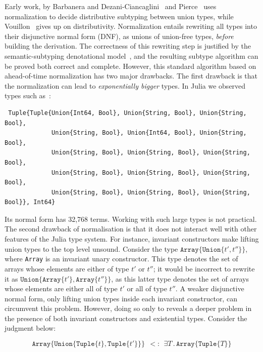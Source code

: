 \documentclass[a4paper,english]{lipics-v2019}
\newcommand{\xt}[1]{\texttt{#1}}
\newcommand{\union}[2]{\xt{Union\{}#1,#2\xt{\}}}
\newcommand{\tuple}[1]{\xt{Tuple\{}#1\xt{\}}}
\newcommand{\arrayt}[1]{\xt{Array\{}#1\xt{\}}}
\begin{document}
Early work, by Barbanera and
Dezani-Ciancaglini~\cite{barbanera1991intersection} and
Pierce~\cite{Pierce1991} uses normalization to decide distributive subtyping
between union types, while Vouillon~\cite{Vouillon04} gives up on
distributivity. Normalization entails rewriting all types into their
disjunctive normal form (DNF), as unions of union-free types, \emph{before}
building the derivation. The correctness of this rewriting step is justified
by the semantic-subtyping denotational model~\cite{Frisch08}, and the
resulting subtype algorithm can be proved both correct and complete.
However, this standard algorithm based on ahead-of-time normalization has
two major drawbacks.  The first drawback is that the normalization can lead
to \emph{exponentially bigger} types. In Julia we observed
types such as~\cite{DBLP:NardelliBPCBV18}:

\begin{small}
\begin{verbatim}
 Tuple{Tuple{Union{Int64, Bool}, Union{String, Bool}, Union{String, Bool}, 
             Union{String, Bool}, Union{Int64, Bool}, Union{String, Bool}, 
             Union{String, Bool}, Union{String, Bool}, Union{String, Bool}, 
             Union{String, Bool}, Union{String, Bool}, Union{String, Bool}, 
             Union{String, Bool}, Union{String, Bool}, Union{String, Bool}}, Int64}
\end{verbatim}
\end{small}

\noindent Its normal form has 32,768 terms. Working with such large types is
not practical.  The second drawback of normalisation is that it does not
interact well with other features of the Julia type system. For instance,
invariant constructors make lifting union types to the top level unsound.
Consider the type {\small \(\arrayt{\union{t'}{t''}}\)}, where {\small
  \texttt{Array}} is an invariant unary constructor.  This type denotes the
set of arrays whose elements are either of type {\small $t'$} or {\small
  $t''$}; it would be incorrect to rewrite it as {\small
  \(\union{\arrayt{t'}}{\arrayt{t''}}\)}, as this latter type denotes the
set of arrays whose elements are either all of type {\small $t'$} or all of
type {\small$t''$}.  A weaker disjunctive normal form, only lifting union
types inside each invariant constructor, can circumvent this
problem. However, doing so only to reveals a deeper problem in the presence
of both invariant constructors and {existential types}.  Consider the
judgment below:

%
{\small\[
  \arrayt{\union{\tuple{t}}{\tuple{t'}}} \ \ <:\ \ \exists T\,.\, \arrayt{\tuple{T}}
\]}
%
\end{document}
